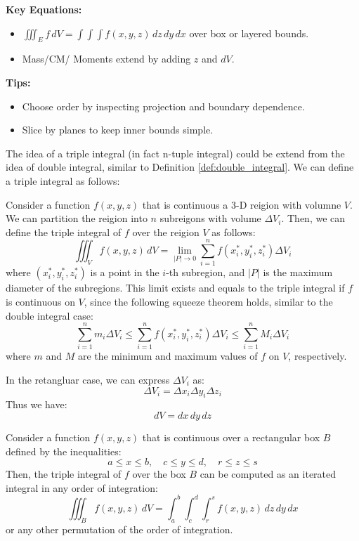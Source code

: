 \documentclass[11pt]{report}
\begin{document}
\begin{keybox}
	\textbf{Key Equations:}
\begin{itemize}
    \item $\displaystyle \iiint_E f\,dV = \int\!\int\!\int f(x,y,z)\,dz\,dy\,dx$ over box or layered bounds.
    \item Mass/CM/ Moments extend by adding $z$ and $dV$.
\end{itemize}
	\textbf{Tips:}
\begin{itemize}
    \item Choose order by inspecting projection and boundary dependence.
    \item Slice by planes to keep inner bounds simple.
\end{itemize}
\end{keybox}
The idea of a triple integral (in fact n-tuple integral) could be extend from the idea of double integral, similar to 
Definition \ref{def:double_integral}. We can define a triple integral as follows:
\begin{definition}
    Consider a function $f(x,y,z)$ that is continuous a 
    3-D reigion with volumne $V$. We can partition the reigion into $n$ subreigons with volume $\Delta V_i$. Then, we can define the triple integral of $f$ over the reigion $V$ as follows:
    \begin{equation}
        \iiint_V f(x,y,z) \, dV = \lim_{|P| \to 0} \sum_{i=1}^n f(x_i^*, y_i^*, z_i^*) \Delta V_i
    \end{equation}
    where $(x_i^*, y_i^*, z_i^*)$ is a point in the $i$-th subregion, and $|P|$ is the maximum diameter of the subregions. This limit exists and equals to the triple integral if $f$ is continuous on $V$, since the following squeeze theorem holds, similar to the double integral case:
    $$       
     \sum_{i=1}^n m_i \Delta V_i \le \sum_{i=1}^n f(x_i^*, y_i^*, z_i^*) \Delta V_i \le \sum_{i=1}^n M_i \Delta V_i
    $$
    where $m$ and $M$ are the minimum and maximum values of $f$ on $V$, respectively.

    In the retangluar case, we can express $\Delta V_i$ as:
    $$        
    \Delta V_i = \Delta x_i \Delta y_i \Delta z_i
    $$
    Thus we have:
    $$
    dV = dx \, dy \, dz
    $$
\end{definition}

\begin{definition}
    Consider a function $f(x,y,z)$ that is continuous over a rectangular box $B$ defined by the inequalities:
    $$
        a \le x \le b, \quad c \le y \le d, \quad r \le z \le s
    $$
    Then, the triple integral of $f$ over the box $B$ can be computed as an iterated integral in any order of integration:
    \begin{equation}
        \iiint_B f(x,y,z) \, dV = \int_a^b \int_c^d \int_r^s f(x,y,z) \, dz \, dy \, dx
    \end{equation}
    or any other permutation of the order of integration.
    
\end{definition}
\end{document}

